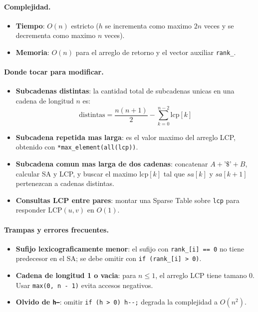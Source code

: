 \paragraph{Complejidad.}
\begin{itemize}\setlength\itemsep{0pt}
	\item \textbf{Tiempo}: $O(n)$ estricto ($h$ se incrementa como maximo $2n$ veces y se decrementa como maximo $n$ veces).
	\item \textbf{Memoria}: $O(n)$ para el arreglo de retorno y el vector auxiliar \verb|rank_|.
\end{itemize}

\paragraph{Donde tocar para modificar.}
\begin{itemize}\setlength\itemsep{0pt}
	\item \textbf{Subcadenas distintas}: la cantidad total de subcadenas unicas en una cadena de longitud $n$ es:
	\[
	\text{distintas} = \frac{n(n + 1)}{2} - \sum_{k=0}^{n-2} \text{lcp}[k]
	\]
	\item \textbf{Subcadena repetida mas larga}: es el valor maximo del arreglo LCP, obtenido con \verb|*max_element(all(lcp))|.
	\item \textbf{Subcadena comun mas larga de dos cadenas}: concatenar $A + \text{'\$'} + B$, calcular SA y LCP, y buscar el maximo $\text{lcp}[k]$ tal que $sa[k]$ y $sa[k+1]$ pertenezcan a cadenas distintas.
	\item \textbf{Consultas LCP entre pares}: montar una Sparse Table sobre \verb|lcp| para responder $\text{LCP}(u, v)$ en $O(1)$.
\end{itemize}

\paragraph{Trampas y errores frecuentes.}
\begin{itemize}\setlength\itemsep{0pt}
	\item \textbf{Sufijo lexicograficamente menor}: el sufijo con \verb|rank_[i] == 0| no tiene predecesor en el SA; se debe omitir con \verb|if (rank_[i] > 0)|.
	\item \textbf{Cadena de longitud 1 o vacia}: para $n \le 1$, el arreglo LCP tiene tamano 0. Usar \verb|max(0, n - 1)| evita accesos negativos.
	\item \textbf{Olvido de \texttt{h--}}: omitir \verb|if (h > 0) h--;| degrada la complejidad a $O(n^2)$.
\end{itemize}

